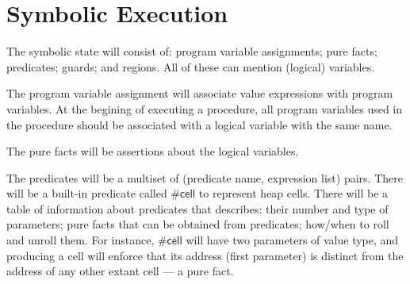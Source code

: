 \documentclass[a4paper]{article}
\begin{document}
\section{Symbolic Execution}

The symbolic state will consist of: program variable assignments; pure facts; predicates; guards; and regions.
All of these can mention (logical) variables.

The program variable assignment will associate value expressions with program variables.
At the begining of executing a procedure, all program variables used in the procedure should be associated with a logical variable with the same name.

The pure facts will be assertions about the logical variables.

The predicates will be a multiset of (predicate name, expression list) pairs.
There will be a built-in predicate called $\mathsf{\#cell}$ to represent heap cells.
There will be a table of information about predicates that describes: their number and type of parameters; pure facts that can be obtained from predicates; how/when to roll and unroll them.
For instance, $\mathsf{\#cell}$ will have two parameters of value type, and producing a cell will enforce that its address (first parameter) is distinct from the address of any other extant cell --- a pure fact.
\end{document}

